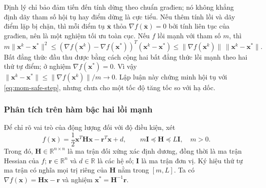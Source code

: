 Định lý chỉ bảo đảm tiến đến tính dừng theo chuẩn građien; nó không
khẳng định dãy tham số hội tụ hay điểm dừng là cực tiểu.
Nếu thêm tính lồi và dãy điểm lặp bị chặn, thì mỗi điểm tụ
$\overline{\mathbf{x}}$ thỏa $\nabla f(\overline{\mathbf{x}})=0$ bởi tính
liên tục của građien, nên là một nghiệm tối ưu toàn cục.
Nếu $f$ lồi mạnh với tham số $m$, thì
\[
 m\|\mathbf{x}^{k}-\mathbf{x}^{*}\|^2
 \leq(\nabla f(\mathbf{x}^{k})-\nabla f(\mathbf{x}^{*}))^T
                  (\mathbf{x}^{k}-\mathbf{x}^{*})
 \leq\|\nabla f(\mathbf{x}^{k})\|\,\|\mathbf{x}^{k}-\mathbf{x}^{*}\|.
\]
Bất đẳng thức đầu thu được bằng cách cộng hai bất đẳng thức lồi mạnh
theo hai thứ tự điểm; ở nghiệm $\nabla f(\mathbf{x}^{*})=0$.
Vì vậy $\|\mathbf{x}^{k}-\mathbf{x}^{*}\|
\leq\|\nabla f(\mathbf{x}^{k})\|/m\to0$.
Lập luận này chứng minh hội tụ với \eqref{eq:mom-safe-step}, nhưng chưa
cho một tốc độ tăng tốc so với hạ dốc.

\subsubsection{Phân tích trên hàm bậc hai lồi mạnh}

Để chỉ rõ vai trò của động lượng đối với độ điều kiện, xét
\begin{equation}
 f(\mathbf{x})=\frac12\mathbf{x}^{T}\mathbf{H}\mathbf{x}
                       -\mathbf{r}^{T}\mathbf{x}+d,
 \qquad m\mathbf{I}\preceq\mathbf{H}\preceq L\mathbf{I},\quad m>0.
 \label{eq:mom-quadratic}
\end{equation}
Trong đó, $\mathbf{H}\in\mathbb{R}^{n\times n}$ là ma trận đối xứng
xác định dương, đồng thời là ma trận Hessian của $f$;
$\mathbf{r}\in\mathbb{R}^{n}$ và $d\in\mathbb{R}$ là các hệ số;
$\mathbf{I}$ là ma trận đơn vị. Ký hiệu thứ tự ma trận có nghĩa mọi trị
riêng của $\mathbf{H}$ nằm trong $[m,L]$.
Ta có $\nabla f(\mathbf{x})=\mathbf{H}\mathbf{x}-\mathbf{r}$ và nghiệm
$\mathbf{x}^{*}=\mathbf{H}^{-1}\mathbf{r}$.


